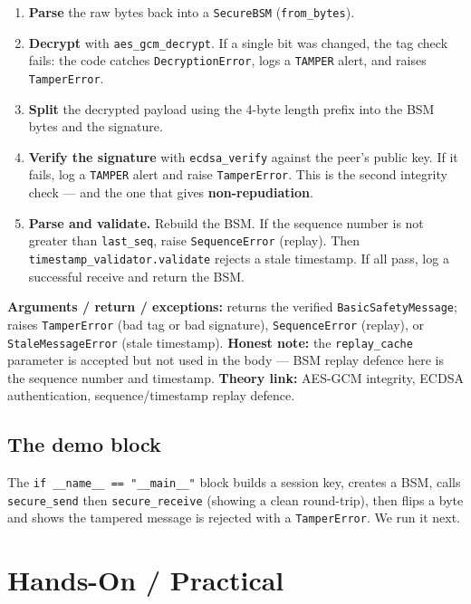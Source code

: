 \documentclass[11pt,a4paper]{report}
\begin{document}
\begin{enumerate}
  \item \textbf{Parse} the raw bytes back into a \texttt{SecureBSM}
        (\texttt{from\_bytes}).
  \item \textbf{Decrypt} with \texttt{aes\_gcm\_decrypt}. If a single bit was
        changed, the tag check fails: the code catches \texttt{DecryptionError},
        logs a \texttt{TAMPER} alert, and raises \texttt{TamperError}.
  \item \textbf{Split} the decrypted payload using the 4-byte length prefix into
        the BSM bytes and the signature.
  \item \textbf{Verify the signature} with \texttt{ecdsa\_verify} against the
        peer's public key. If it fails, log a \texttt{TAMPER} alert and raise
        \texttt{TamperError}. This is the second integrity check --- and the one
        that gives \textbf{non-repudiation}.
  \item \textbf{Parse and validate.} Rebuild the BSM. If the sequence number is
        not greater than \texttt{last\_seq}, raise \texttt{SequenceError}
        (replay). Then \texttt{timestamp\_validator.validate} rejects a stale
        timestamp. If all pass, log a successful receive and return the BSM.
\end{enumerate}
\textbf{Arguments / return / exceptions:} returns the verified
\texttt{BasicSafetyMessage}; raises \texttt{TamperError} (bad tag or bad
signature), \texttt{SequenceError} (replay), or \texttt{StaleMessageError}
(stale timestamp). \textbf{Honest note:} the \texttt{replay\_cache} parameter is
accepted but not used in the body --- BSM replay defence here is the sequence
number and timestamp. \textbf{Theory link:} AES-GCM integrity, ECDSA
authentication, sequence/timestamp replay defence.

\subsection{The demo block}
The \texttt{if \_\_name\_\_ == "\_\_main\_\_"} block builds a session key, creates
a BSM, calls \texttt{secure\_send} then \texttt{secure\_receive} (showing a clean
round-trip), then flips a byte and shows the tampered message is rejected with a
\texttt{TamperError}. We run it next.

\section{Hands-On / Practical}
\end{document}
